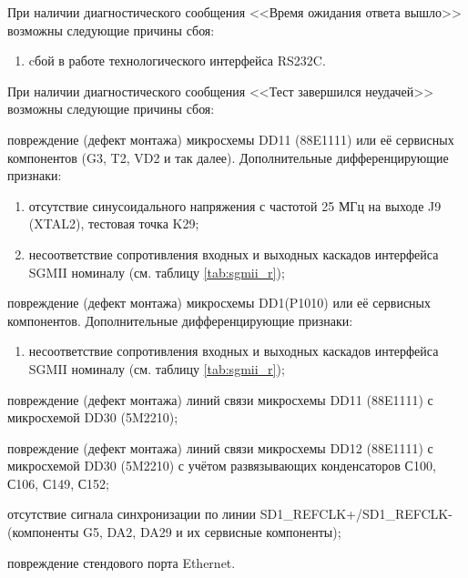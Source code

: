     \subpoint При наличии диагностического сообщения <<Время ожидания ответа вышло>> возможны следующие причины сбоя:
      \begin{enumerate}
	\item cбой в работе технологического интерфейса RS232C.
      \end{enumerate}
      
    \subpoint При наличии диагностического сообщения <<Тест завершился неудачей>> возможны следующие причины сбоя:
      \begin{enumerate}\begin{sloppypar}
	\item повреждение (дефект монтажа) микросхемы DD11 (88E1111) или её сервисных компонентов (G3, T2, VD2 и так далее). Дополнительные дифференцирующие признаки:
	  \begin{enumerate}
	    \item отсутствие синусоидального напряжения с частотой 25 МГц на выходе J9 (XTAL2), тестовая точка K29;
	    \item несоответствие сопротивления входных и выходных каскадов интерфейса SGMII номиналу (см. таблицу \ref{tab:sgmii_r});    
	  \end{enumerate}
	\item повреждение (дефект монтажа) микросхемы DD1(P1010) или её сервисных компонентов. Дополнительные дифференцирующие признаки:
	  \begin{enumerate}	  
	    \item несоответствие сопротивления входных и выходных каскадов интерфейса SGMII номиналу (см. таблицу \ref{tab:sgmii_r}); 
	  \end{enumerate}
	\item повреждение (дефект монтажа) линий связи микросхемы DD11 (88E1111) с микросхемой DD30 (5M2210);
	\item повреждение (дефект монтажа) линий связи микросхемы DD12 (88E1111) с микросхемой DD30 (5M2210) с учётом развязывающих конденсаторов С100, С106, С149, С152;
	\item отсутствие сигнала синхронизации по линии SD1\_REFCLK+/SD1\_REFCLK- (компоненты G5, DA2, DA29 и их сервисные компоненты);
	\item повреждение стендового порта Ethernet.
      \end{sloppypar}\end{enumerate}
      
